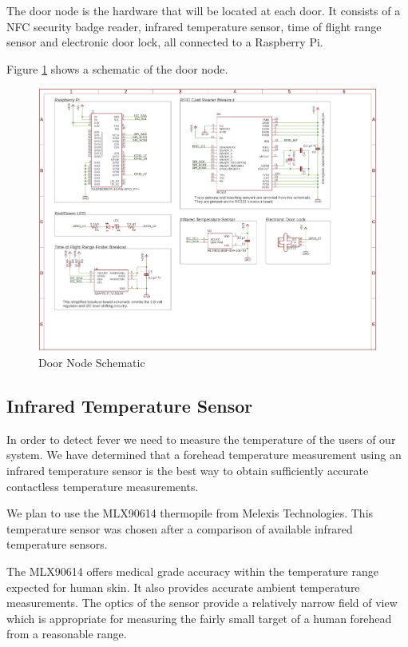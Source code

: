 The door node is the hardware that will be located at each door. It consists of
a NFC security badge reader, infrared temperature sensor, time of flight range
sensor and electronic door lock, all connected to a Raspberry Pi.

Figure \ref{fig:door-node-schematic} shows a schematic of the door node.

\begin{figure}[!htb]
\centering
\includegraphics[width=\textwidth]{images/door-node-schematic.png}
\caption{Door Node Schematic}
\label{fig:door-node-schematic}
\end{figure}

\subsection{Infrared Temperature Sensor}

In order to detect fever we need to measure the temperature of the users of our
system. We have determined that a forehead temperature measurement using an
infrared temperature sensor is the best way to obtain sufficiently accurate
contactless temperature measurements.

We plan to use the MLX90614 thermopile from Melexis Technologies. This
temperature sensor was chosen after a comparison of available infrared
temperature sensors.

The MLX90614 offers medical grade accuracy within the temperature range expected
for human skin. It also provides accurate ambient temperature measurements. The
optics of the sensor provide a relatively narrow field of view which is
appropriate for measuring the fairly small target of a human forehead from a
reasonable range.

